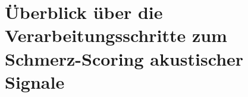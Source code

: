 



\section{Überblick über die Verarbeitungsschritte zum Schmerz-Scoring akustischer Signale}
\label{sec:pipeline}


